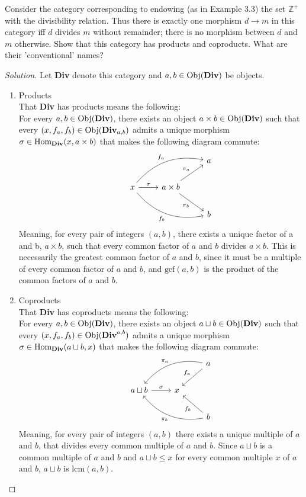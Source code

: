 \documentclass[12pt]{article}
\newenvironment{problem}[2][Problem]{\begin{trivlist}
\item[\hskip \labelsep {\bfseries #1}\hskip \labelsep {\bfseries #2.}]}{\end{trivlist}}
\newcommand{\catname}[1]{\normalfont\textbf{#1}}
\newcommand{\catsup}[2]{\normalfont\textbf{#1}^{#2}}
\newcommand{\catsub}[2]{\normalfont\textbf{#1}_{#2}}
\newcommand{\Hom}{\text{Hom}}
\newcommand{\Homc}[2]{\Hom_{\catname{#1}}(#2)}
\newcommand{\Obj}{\text{Obj}}
\newcommand{\Objc}[1]{\text{Obj}(\catname{#1})}
\newenvironment{solution}
  {\renewcommand\qedsymbol{$\blacksquare$}\begin{proof}[Solution]}
{\end{proof}}
\begin{document}
\begin{problem}{5.6}
  Consider the category corresponding to endowing (as in Example 3.3) the set $\mathbb{Z}^+$ with the divisibility relation. 
  Thus there is exactly one morphism $d \to m$ in this category iff $d$ divides $m$ without remainder; there is no morphism between $d$ and $m$ otherwise.
  Show that this category has products and coproducts. What are their 'conventional' names?
\end{problem}
\begin{solution}
  Let \catname{Div} denote this category and $a, b \in \Objc{Div}$ be objects.
  \begin{enumerate}
    \item Products\\
        That \catname{Div} has products means the following:\\
    For every $a, b \in \Objc{Div}$, 
    there exists an object $a\times b \in \Objc{Div}$ such that
    every $(x,f_a,f_b) \in \Obj(\catsub{Div}{a,b})$
    admits a unique morphism $\sigma \in \Homc{Div}{x, a\times b}$
    that makes the following diagram commute:
    \[\begin{tikzcd}
      &&&a\\
      &x \ar[bend left]{urr}{f_a} \ar{r}{\sigma} \ar[bend right]{drr}[swap]{f_b}
      &a\times b \ar{ur}{\pi_a} \ar{dr}[swap]{\pi_b}&\\
      &&&b
    \end{tikzcd}\]
    Meaning, for every pair of integers $(a,b)$, there exists a unique
    factor of a and b, $a\times b$, such that 
    every common factor of $a$ and $b$ divides $a\times b$.
    This is necessarily the greatest common factor of $a$ and $b$, since
    it must be a multiple of every common factor of $a$ and $b$, and 
    $\text{gcf}(a,b)$ is the product of the common factors of $a$ and $b$.
  \item Coproducts\\
    That \catname{Div} has coproducts means the following:\\
    For every $a, b \in \Objc{Div}$, 
    there exists an object $a\sqcup b \in \Objc{Div}$ such that
    every $(x,f_a,f_b) \in \Obj(\catsup{Div}{a,b})$
    admits a unique morphism $\sigma \in \Homc{Div}{a\sqcup b, x}$
    that makes the following diagram commute:
    \[\begin{tikzcd}
        &&&a \ar[bend right, swap]{dll}{\pi_a} \ar[swap]{dl}{f_a}\\
      &a\sqcup b \ar{r}{\sigma} 
      &x &\\
      &&&b \ar[bend left]{ull}{\pi_b} \ar{ul}{f_b}
    \end{tikzcd}\]
    Meaning, for every pair of integers $(a,b)$ there exists a unique multiple of $a$ and $b$, that divides every common multiple of $a$ and $b$. 
    Since $a\sqcup b$ is a common multiple of $a$ and $b$ and $a\sqcup b \leq x$ for every common multiple $x$ of $a$ and $b$, $a\sqcup b$ is $\text{lcm}(a,b)$.
  \end{enumerate}
\end{solution}
\end{document}
